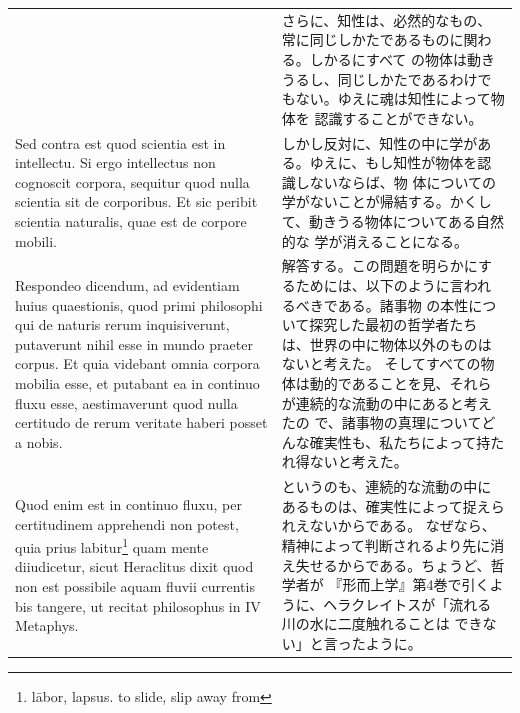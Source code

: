 \documentclass[paper=a4paper,fontsize=10pt,jafontsize=9pt,titlepage]{jlreq}
\begin{document}
\begin{longtable}{p{21em}p{21em}}
 &

 さらに、知性は、必然的なもの、常に同じしかたであるものに関わる。しかるにすべて
 の物体は動きうるし、同じしかたであるわけでもない。ゆえに魂は知性によって物体を
 認識することができない。

 \\[1em]

 Sed contra est quod scientia est in intellectu. Si ergo intellectus non
 cognoscit corpora, sequitur quod nulla scientia sit de corporibus. Et sic
 peribit scientia naturalis, quae est de corpore mobili.

 &

 しかし反対に、知性の中に学がある。ゆえに、もし知性が物体を認識しないならば、物
 体についての学がないことが帰結する。かくして、動きうる物体についてある自然的な
 学が消えることになる。
 
 \\[1em]

 Respondeo dicendum, ad evidentiam huius quaestionis, quod primi philosophi qui
 de naturis rerum inquisiverunt, putaverunt nihil esse in mundo praeter
 corpus. Et quia videbant omnia corpora mobilia esse, et putabant ea in continuo
 fluxu esse, aestimaverunt quod nulla certitudo de rerum veritate haberi posset
 a nobis.

 &

解答する。この問題を明らかにするためには、以下のように言われるべきである。諸事物
の本性について探究した最初の哲学者たちは、世界の中に物体以外のものはないと考えた。
そしてすべての物体は動的であることを見、それらが連続的な流動の中にあると考えたの
で、諸事物の真理についてどんな確実性も、私たちによって持たれ得ないと考えた。
 
\\[1em]

 Quod enim est in continuo fluxu, per certitudinem apprehendi non potest, quia
 prius labitur\footnote{l\={a}bor, lapsus. to slide, slip away from} quam mente
 diiudicetur, sicut Heraclitus dixit quod non est possibile aquam fluvii
 currentis bis tangere, ut recitat philosophus in IV Metaphys.

 &

というのも、連続的な流動の中にあるものは、確実性によって捉えられえないからである。
なぜなら、精神によって判断されるより先に消え失せるからである。ちょうど、哲学者が
『形而上学』第4巻で引くように、ヘラクレイトスが「流れる川の水に二度触れることは
できない」と言ったように。
 
\\[1em]


\end{longtable}
\end{document}
